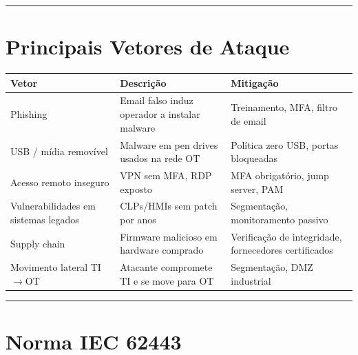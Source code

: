 \begin{center}\rule{0.5\linewidth}{0.5pt}\end{center}

\section{Principais Vetores de Ataque}\label{principais-vetores-de-ataque}

\begin{longtable}[]{@{}
  >{\raggedright\arraybackslash}p{}
  >{\raggedright\arraybackslash}p{}
  >{\raggedright\arraybackslash}p{}@{}}
\toprule\noalign{}
\begin{minipage}[b]{\linewidth}\raggedright
Vetor
\end{minipage} & \begin{minipage}[b]{\linewidth}\raggedright
Descrição
\end{minipage} & \begin{minipage}[b]{\linewidth}\raggedright
Mitigação
\end{minipage} \\
\midrule\noalign{}
\endhead
\bottomrule\noalign{}
\endlastfoot
Phishing & Email falso induz operador a instalar malware & Treinamento, MFA, filtro de email \\
USB / mídia removível & Malware em pen drives usados na rede OT & Política zero USB, portas bloqueadas \\
Acesso remoto inseguro & VPN sem MFA, RDP exposto & MFA obrigatório, jump server, PAM \\
Vulnerabilidades em sistemas legados & CLPs/HMIs sem patch por anos & Segmentação, monitoramento passivo \\
Supply chain & Firmware malicioso em hardware comprado & Verificação de integridade, fornecedores certificados \\
Movimento lateral TI\ensuremath{\rightarrow}OT & Atacante compromete TI e se move para OT & Segmentação, DMZ industrial \\
\end{longtable}

\begin{center}\rule{0.5\linewidth}{0.5pt}\end{center}

\section{Norma IEC 62443}\label{norma-iec-62443}

